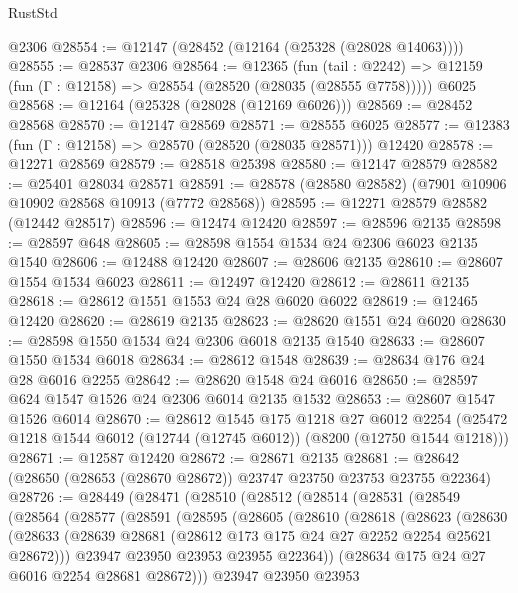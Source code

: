 \begin{lexlean}{RustStd}
\begin{coremodule}
    @2306
@28554 := @12147 (@28452 (@12164 (@25328 (@28028 @14063))))
@28555 := @28537 @2306
@28564 := @12365
    (fun (tail : @2242) => @12159 (fun (Γ : @12158) => @28554 (@28520 (@28035 (@28555 @7758)))))
    @6025
@28568 := @12164 (@25328 (@28028 (@12169 @6026)))
@28569 := @28452 @28568
@28570 := @12147 @28569
@28571 := @28555 @6025
@28577 := @12383 (fun (Γ : @12158) => @28570 (@28520 (@28035 @28571))) @12420
@28578 := @12271 @28569
@28579 := @28518 @25398
@28580 := @12147 @28579
@28582 := @25401 @28034 @28571
@28591 := @28578 (@28580 @28582) (@7901 @10906 @10902 @28568 @10913 (@7772 @28568))
@28595 := @12271 @28579 @28582 (@12442 @28517)
@28596 := @12474 @12420
@28597 := @28596 @2135
@28598 := @28597 @648
@28605 := @28598 @1554 @1534 @24 @2306 @6023 @2135 @1540
@28606 := @12488 @12420
@28607 := @28606 @2135
@28610 := @28607 @1554 @1534 @6023
@28611 := @12497 @12420
@28612 := @28611 @2135
@28618 := @28612 @1551 @1553 @24 @28 @6020 @6022
@28619 := @12465 @12420
@28620 := @28619 @2135
@28623 := @28620 @1551 @24 @6020
@28630 := @28598 @1550 @1534 @24 @2306 @6018 @2135 @1540
@28633 := @28607 @1550 @1534 @6018
@28634 := @28612 @1548
@28639 := @28634 @176 @24 @28 @6016 @2255
@28642 := @28620 @1548 @24 @6016
@28650 := @28597 @624 @1547 @1526 @24 @2306 @6014 @2135 @1532
@28653 := @28607 @1547 @1526 @6014
@28670 := @28612
    @1545
    @175
    @1218
    @27
    @6012
    @2254
    (@25472 @1218 @1544 @6012 (@12744 (@12745 @6012)) (@8200 (@12750 @1544 @1218)))
@28671 := @12587 @12420
@28672 := @28671 @2135
@28681 := @28642 (@28650 (@28653 (@28670 @28672)) @23747 @23750 @23753 @23755 @22364)
@28726 := @28449
    (@28471
      (@28510
        (@28512
          (@28514
            (@28531
              (@28549
                (@28564
                  (@28577
                    (@28591
                      (@28595
                        (@28605
                          (@28610
                            (@28618
                              (@28623
                                (@28630
                                  (@28633
                                    (@28639
                                      @28681
                                      (@28612 @173 @175 @24 @27 @2252 @2254 @25621 @28672)))
                                  @23947
                                  @23950
                                  @23953
                                  @23955
                                  @22364))
                              (@28634 @175 @24 @27 @6016 @2254 @28681 @28672)))
                          @23947
                          @23950
                          @23953

\end{coremodule}
\end{lexlean}
